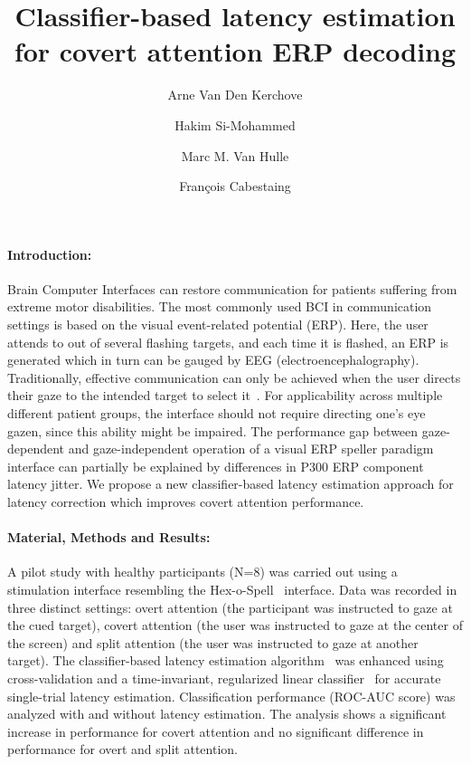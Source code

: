 \documentclass{article}
\title{Classifier-based latency estimation for covert attention ERP decoding}
\author[1,2,*]{Arne Van Den Kerchove}
\author[1]{Hakim Si-Mohammed}
\author[2]{Marc M. Van Hulle}
\author[1]{François Cabestaing}
\affil[1]{\small UMR CRIStAL, Université de Lille}
\affil[2]{\small Laboratory for Neuro- and Psychophysiology, KU Leuven}
\affil[*]{\small Herestraat 49 bus 1021,Leuven, Belgium. Email: \texttt{arne.vandenkerchove@kuleuven.be}}
\date{}
\begin{document}
\maketitle

\paragraph{Introduction:}
Brain Computer Interfaces can restore communication for patients suffering from extreme motor disabilities.
The most commonly used BCI in communication settings is based on the visual event-related potential (ERP).
Here, the user attends to out of several flashing targets, and each time it is flashed, an ERP is generated which in turn can be gauged by EEG (electroencephalography).
Traditionally, effective communication can only be achieved when the user directs their gaze to the intended target to select it~\cite{Treder2010}.
For applicability across multiple different patient groups, the interface should not require directing one's eye gazen, since this ability might be impaired.
The performance gap between gaze-dependent and gaze-independent operation of a visual ERP speller paradigm interface can partially be explained by differences in P300 ERP component latency jitter. We propose a new classifier-based latency estimation approach for latency correction which improves covert attention performance.

\paragraph{Material, Methods and Results:}
A pilot study with healthy participants (N=8) was carried out using a stimulation interface resembling the Hex-o-Spell~\cite{Treder2010} interface.
Data was recorded in three distinct settings: overt attention (the participant was instructed to gaze at the cued target), covert attention (the user was instructed to gaze at the center of the screen) and split attention (the user was instructed to gaze at another target).
The classifier-based latency estimation algorithm~\cite{Thompson2012} was enhanced using cross-validation and a time-invariant, regularized linear classifier~\cite{VanDenKerchove2022} for accurate single-trial latency estimation. Classification performance (ROC-AUC score) was analyzed with and without latency estimation. The analysis shows a significant increase in performance for covert attention and no significant difference in performance for overt and split attention.
\end{document}
